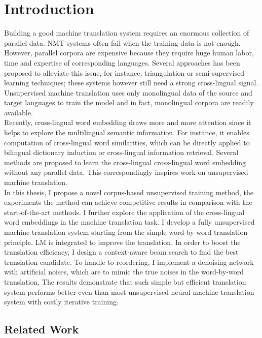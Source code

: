 
\chapter{Introduction}
Building a good machine translation system requires an enormous collection of parallel data. NMT systems often fail when the training data is not enough.  However, parallel corpora are expensive because they require huge human labor, time and expertise of corresponding languages.
\indent Several approaches has been proposed to alleviate this issue, for instance, triangulation or semi-supervised learning techniques; these systems however still need a strong cross-lingual signal. Unsupervised machine translation uses only monolingual data of the source and target languages to train the model and in fact, monolingual corpora are readily available.\\
Recently, cross-lingual word embedding draws more and more attention since it helps to explore the multilingual semantic information. For instance, it enables computation of cross-lingual word similarities, which  can be directly applied to bilingual dictionary induction or cross-lingual information retrieval. Several methods are proposed to learn the cross-lingual cross-lingual word embedding without any parallel data. This correspondingly inspires work on unsupervised machine translation.\\
In this thesis, I propose a novel corpus-based unsupervised training method, the experiments the method can achieve competitive results  in comparison with the start-of-the-art methods. I further explore the 
application of the cross-lingual word embeddings in the machine translation task.
I develop a fully unsupervised machine translation system starting from the simple word-by-word translation principle. LM is integrated to improve the translation. In order to boost the translation efficiency, I design a context-aware beam search to find the best translation candidate. To handle to reordering, I implement a denoising network with artificial noises, which are to mimic the true noises in the word-by-word translation, The results demonstrate that such simple but efficient translation system performs better even than most unsupervised neural machine translation system with costly iterative training.


\section{Related Work}

